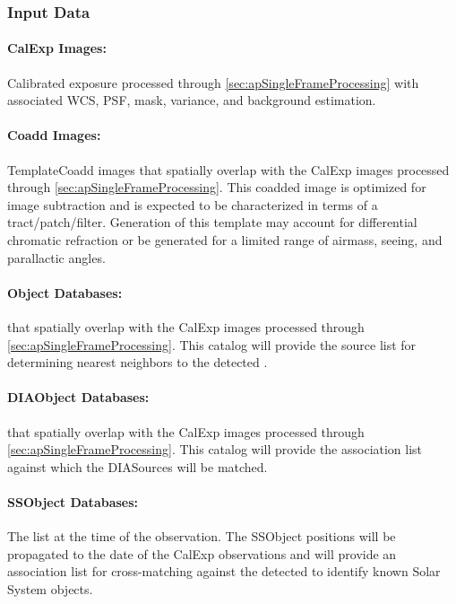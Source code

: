 \subsubsection{Input Data}
\label{sec:apADInput}

\paragraph*{CalExp Images:} Calibrated exposure processed through \ref{sec:apSingleFrameProcessing} with associated WCS, PSF, mask, variance, and background estimation.

\paragraph*{Coadd Images:} TemplateCoadd images that spatially overlap with the CalExp images processed through \ref{sec:apSingleFrameProcessing}. This coadded image is optimized for image subtraction and is expected to be characterized in terms of a tract/patch/filter. Generation of this template may account for differential chromatic refraction or be generated for a limited range of airmass, seeing, and parallactic angles.

\paragraph*{Object Databases:} \Objects that spatially overlap with the CalExp images processed through \ref{sec:apSingleFrameProcessing}. This \Object catalog will provide the source list for determining nearest neighbors to the detected \DIASources. 


\paragraph*{DIAObject Databases:} \DIAObjects that spatially overlap with the CalExp images processed through \ref{sec:apSingleFrameProcessing}. This \DIAObject catalog will provide the association  list against which the DIASources will be matched. 

\paragraph*{SSObject Databases:} The \SSObject list at the time of the observation. The SSObject positions will be propagated to the date of the CalExp observations and will provide an association  list for cross-matching against the detected \DIASources to identify known Solar System objects.

